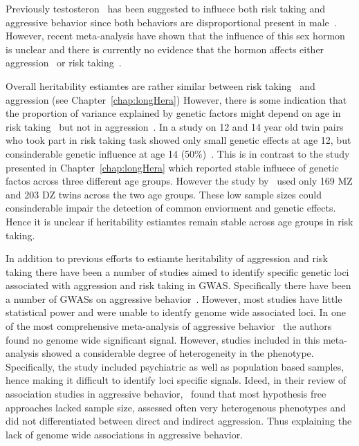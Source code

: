 Previously testosteron~\cite{Vermeersch2008} has been suggested to influece both risk taking and aggressive behavior since both behaviors are disproportional present in male~\cite{Byrnes1999}.
However, recent meta-analysis have shown that  the influence of this sex hormon is unclear and there is currently no evidence that the hormon affects either aggression~\cite{Archer2005a} or risk taking~\cite{Vermeersch2008}.

Overall heritability estiamtes are rather similar between risk taking~\cite{Anokhin2009} and aggression (see Chapter~\ref{chap:longHera})
However, there is some indication that the proportion of variance explained by genetic factors might depend on age in risk taking~\cite{Anokhin2009} but not in aggression~\cite{Porsch2016}.
In a study on 12 and 14 year old twin pairs who took part in risk taking task showed only small genetic effects at age 12, but consinderable genetic influence at age 14 (50\%)~\cite{Anokhin2009}.
This is in contrast to the study presented in Chapter~\ref{chap:longHera} which reported stable influece of genetic factos across three different age groups.
However the study by~\citet{Anokhin2009} used only 169 MZ and 203 DZ twins across the two age groups.
These low sample sizes could consinderable impair the detection of common enviorment and genetic effects. 
Hence it is unclear if heritability estiamtes remain stable across age groups in risk taking.

In addition to previous efforts to estiamte heritability of aggression and risk taking there have been a number of studies aimed to identify specific genetic loci associated with aggression and risk taking in GWAS\@.
Specifically there have been a number of GWASs on aggressive behavior~\cite{Fernandez-Castillo2016}.
However, most studies have little statistical power and were unable to identfy genome wide associated loci.
In one of the most comprehensive meta-analysis of aggressive behavior~\citet{Vassos2014} the authors found no genome wide significant signal.
However, studies included in this meta-analysis showed a considerable degree of heterogeneity in the phenotype.
Specifically, the study included psychiatric as well as population based samples, hence making it difficult to identify loci specific signals.
Ideed, in their review of association studies in aggressive behavior,~\citet{Fernandez-Castillo2016} found that most hypothesis free approaches lacked sample size, assessed often very heterogenous phenotypes and did not differentiated between direct and indirect aggression. 
Thus explaining the lack of genome wide associations in aggressive behavior.


